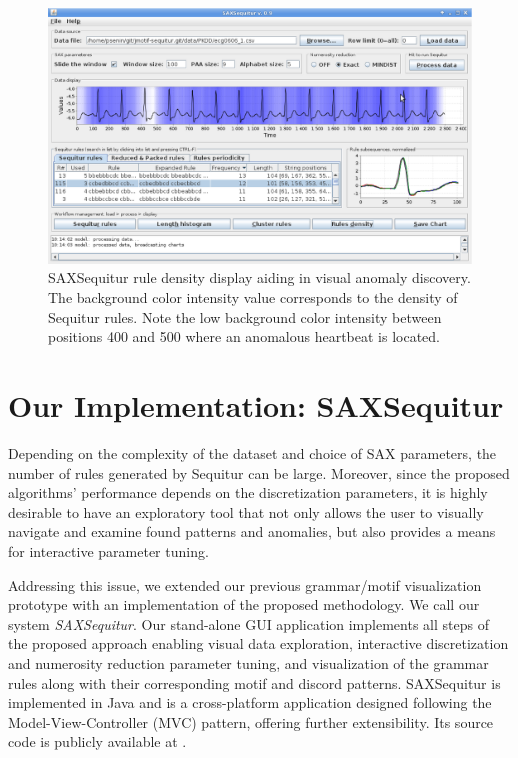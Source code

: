 \documentclass{llncs}
\begin{document}
\begin{figure}[t]
   \vspace{-0.2cm}
   \hspace{-0.1cm}  
   \centering
   \includegraphics[width=123mm]{ECG2_screen_density.eps}
   \caption{
   SAXSequitur rule density display aiding in visual anomaly discovery. The background color intensity value corresponds to the density of Sequitur rules. Note the low background color intensity between positions 400 and 500 where an anomalous heartbeat is located.}
   \label{fig:densityECG}
   \vspace{-0.3cm}
\end{figure}

\section{Our Implementation: SAXSequitur}\label{section_implementation}
Depending on the complexity of the dataset and choice of SAX parameters, the number of rules generated by Sequitur can be large. Moreover, since the proposed algorithms' performance depends on the discretization parameters, it is highly desirable to have an exploratory tool that not only allows the user to visually navigate and examine found patterns and anomalies, but also provides a means for interactive parameter tuning.

Addressing this issue, we extended our previous grammar/motif visualization prototype with an implementation of the proposed methodology. We call our system \textit{SAXSequitur}. Our stand-alone GUI application implements all steps of the proposed approach enabling visual data exploration, interactive discretization and numerosity reduction parameter tuning, and visualization of the grammar rules along with their corresponding motif and discord patterns. SAXSequitur is implemented in Java and is a cross-platform application designed following the Model-View-Controller (MVC) pattern, offering further extensibility. Its source code is publicly available at \cite{jmotif}.
\end{document}
